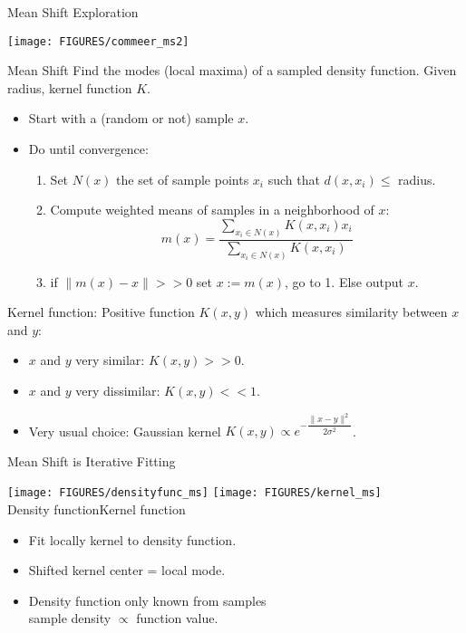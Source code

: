 \documentclass[9pt]{beamer}
\begin{document}
\begin{frame}{Mean Shift Exploration}
  \begin{center}
    \texttt{[image: FIGURES/commeer\_ms2]}
  \end{center}
\end{frame}

\begin{frame}{Mean Shift}
  Find the modes (local maxima) of a sampled density function.
  Given radius, kernel function $K$.
  \begin{itemize}
  \item Start with a (random or not) sample $x$.
  \item Do until convergence:
    \begin{enumerate}
    \item Set $N(x)$ the set of sample points $x_i$ such that $d(x,x_i) \leq$ radius.
    \item Compute weighted means of samples in a neighborhood of $x$:
      $$
      m(x) = \frac{\sum_{x_i\in N(x)} K(x,x_i)x_i}{\sum_{x_i\in N(x)} K(x,x_i)}
      $$
    \item if $\|m(x) - x\| >> 0$ set $x := m(x)$, go to 1. Else output $x$. 
    \end{enumerate}
  \end{itemize}\vfill
  \pause
  Kernel function: Positive function $K(x,y)$ which measures similarity between $x$ and $y$: 
  \begin{itemize}
  \item $x$ and $y$ very similar: $K(x,y) >> 0$.  
  \item$ x$ and $y$ very dissimilar: $K(x,y) << 1$.
  \item Very usual choice: Gaussian kernel $ K(x,y) \propto e^{-\dfrac{\|x-y\|^2}{2\sigma^2}}$.
  \end{itemize}
\end{frame}


\begin{frame}{Mean Shift is Iterative Fitting}
  \begin{center}
    \texttt{[image: FIGURES/densityfunc\_ms]}\hfill
    \texttt{[image: FIGURES/kernel\_ms]}\hfill\\
    Density function\hfill Kernel function
  \end{center}
  \begin{itemize}
  \item Fit locally kernel to density function.
  \item Shifted kernel center = local mode.
  \item Density function only known from samples\\sample density $\propto$ function value.
  \end{itemize}
\end{frame}
\end{document}
